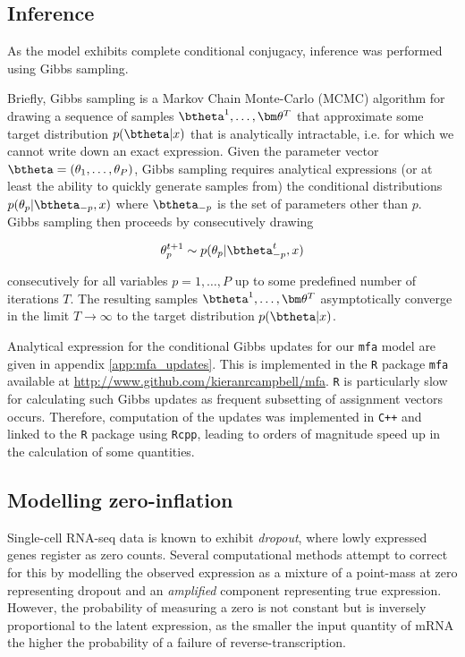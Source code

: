 \subsection{Inference}

As the model exhibits complete conditional conjugacy, inference was performed using Gibbs sampling.

Briefly, Gibbs sampling is a Markov Chain Monte-Carlo (MCMC) algorithm for drawing a sequence of samples $\btheta^1, \ldots, \bm \theta^T$ that approximate some target distribution $p(\btheta | x)$ that is analytically intractable, i.e. for which we cannot write down an exact expression. Given the parameter vector $\btheta = (\theta_1, \ldots, \theta_P)$, Gibbs sampling requires analytical expressions (or at least the ability to quickly generate samples from) the conditional distributions $p(\theta_p | \btheta_{-p}, x)$ where $\btheta_{-p}$ is the set of parameters other than $p$. Gibbs sampling then proceeds by consecutively drawing

\begin{equation}
		\theta_p^{t+1}  \sim p(\theta_p | \btheta^t_{-p}, x)
\end{equation}

consecutively for all variables $p = 1, \ldots, P$ up to some predefined number of iterations $T$. The resulting samples $\btheta^1, \ldots, \bm \theta^T$ asymptotically converge in the limit $T \rightarrow \infty$ to the target distribution $p(\btheta | x)$.

Analytical expression for the conditional Gibbs updates for our \texttt{mfa} model are given in appendix \ref{app:mfa_updates}. This is implemented in the \texttt{R} package \texttt{mfa} available at \url{http://www.github.com/kieranrcampbell/mfa}. \texttt{R} is particularly slow for calculating such Gibbs updates as frequent subsetting of assignment vectors occurs. Therefore, computation of the updates was implemented in \texttt{C++} and linked to the \texttt{R} package using \texttt{Rcpp}, leading to orders of magnitude speed up in the calculation of some quantities.

\subsection{Modelling zero-inflation}

Single-cell RNA-seq data is known to exhibit \emph{dropout}, where lowly expressed genes register as zero counts. Several computational methods attempt to correct for this by modelling the observed expression as a mixture of a point-mass at zero representing dropout and an \emph{amplified} component representing true expression. However, the probability of measuring a zero is not constant but is inversely proportional to the latent expression, as the smaller the input quantity of mRNA the higher the probability of a failure of reverse-transcription.

